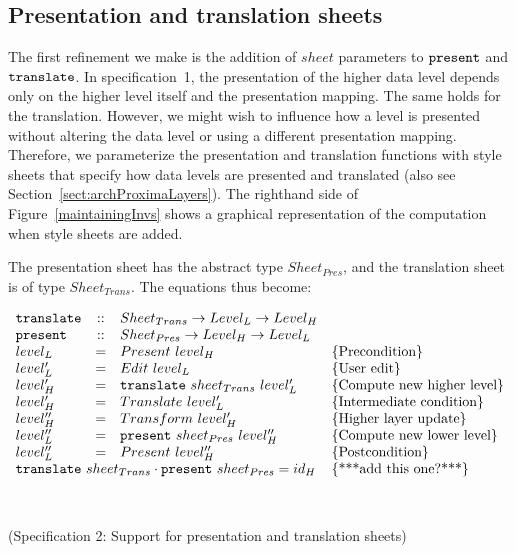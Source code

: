 %																
%																
%																
\subsection{Presentation and translation sheets} \label{sect:maintainingSheet}

The first refinement we make is the addition of $sheet$ parameters to ${\tt present}$ and ${\tt translate}$. In specification~1, the presentation of the higher data level depends only on the higher level itself and the presentation mapping. The same holds for the translation. However, we might wish to influence how a level is presented without altering the data level or using a different presentation mapping. Therefore, we parameterize the presentation and translation functions with style sheets that specify how data levels are presented and translated (also see Section~\ref{sect:archProximaLayers}). The righthand side of Figure~\ref{maintainingInvs} shows a graphical representation of the computation when style sheets are added. 

The presentation sheet has the abstract type $Sheet_{Pres}$, and the translation sheet is of type $Sheet_{Trans}$. The equations thus become:

\begin{small}\( \begin{array}{lcll} \label{inv:sheets}
{\tt translate} &::& Sheet_{Trans} \rightarrow  Level_{L} \rightarrow Level_{H} \\
{\tt present} &::& Sheet_{Pres} \rightarrow  Level_{H} \rightarrow Level_{L} \\
level_{L} & = & Present~level_{H}					& \text{\{Precondition\}}\\
level'_{L} & = & Edit~level_{L}						& \text{\{User edit\}}\\
level'_{H} & = & {\tt translate}~sheet_{Trans}~level'_{L}	& \text{\{Compute new higher level\}}\\
level'_{H} & = & Translate~level'_{L}					& \text{\{Intermediate condition\}}\\
level''_{H}& = & Transform~level'_{H} 					& \text{\{Higher layer update\}}\\
level''_{L} & = & {\tt present}~sheet_{Pres}~level''_{H}    & \text{\{Compute new lower level\}}\\
level''_{L} & = & Present~level''_{H}					& \text{\{Postcondition\}}\\
\lefteqn{{\tt translate}~sheet_{Trans} \cdot {\tt present}~sheet_{Pres} = id_{H}} & & & \text{\{***add this one?***\}}\\
\end{array}\)\end{small}\\
\begin{center}(Specification 2: Support for presentation and translation sheets)\end{center}\vspace{1em}

